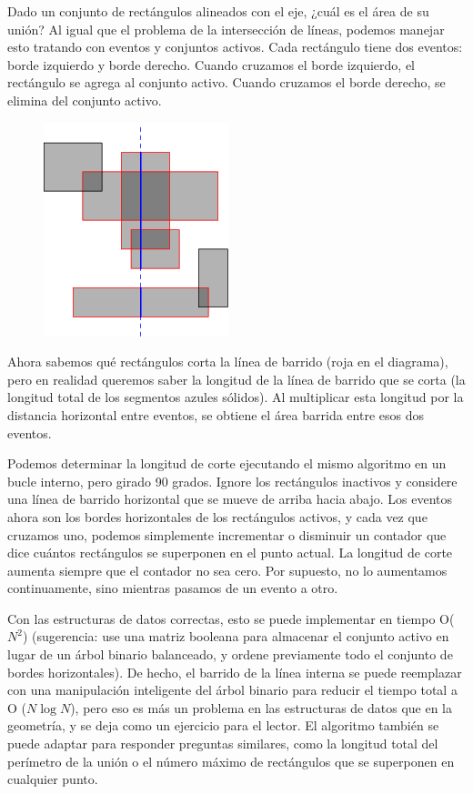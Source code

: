 Dado un conjunto de rectángulos alineados con el eje, ¿cuál es el área de su unión? Al igual que el problema de la intersección de líneas, podemos manejar esto tratando con eventos y conjuntos activos. Cada rectángulo tiene dos eventos: borde izquierdo y borde derecho. Cuando cruzamos el borde izquierdo, el rectángulo se agrega al conjunto activo. Cuando cruzamos el borde derecho, se elimina del conjunto activo.

\begin{figure}[h!]
	\centering
	\includegraphics[width=0.2\linewidth]{img/rects}
	\label{fig:rects}
\end{figure}

Ahora sabemos qué rectángulos corta la línea de barrido (roja en el diagrama), pero en realidad queremos saber la longitud de la línea de barrido que se corta (la longitud total de los segmentos azules sólidos). Al multiplicar esta longitud por la distancia horizontal entre eventos, se obtiene el área barrida entre esos dos eventos.

Podemos determinar la longitud de corte ejecutando el mismo algoritmo en un bucle interno, pero girado 90 grados. Ignore los rectángulos inactivos y considere una línea de barrido horizontal que se mueve de arriba hacia abajo. Los eventos ahora son los bordes horizontales de los rectángulos activos, y cada vez que cruzamos uno, podemos simplemente incrementar o disminuir un contador que dice cuántos rectángulos se superponen en el punto actual. La longitud de corte aumenta siempre que el contador no sea cero. Por supuesto, no lo aumentamos continuamente, sino mientras pasamos de un evento a otro.

Con las estructuras de datos correctas, esto se puede implementar en tiempo O($N^2$) (sugerencia: use una matriz booleana para almacenar el conjunto activo en lugar de un árbol binario balanceado, y ordene previamente todo el conjunto de bordes horizontales). De hecho, el barrido de la línea interna se puede reemplazar con una manipulación inteligente del árbol binario para reducir el tiempo total a O ($N \log N$), pero eso es más un problema en las estructuras de datos que en la geometría, y se deja como un ejercicio para el lector. El algoritmo también se puede adaptar para responder preguntas similares, como la longitud total del perímetro de la unión o el número máximo de rectángulos que se superponen en cualquier punto.